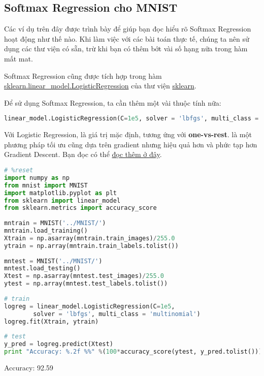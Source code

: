  
\subsection{Softmax Regression cho MNIST}
Các ví dụ trên đây được trình bày để giúp bạn đọc hiểu rõ Softmax Regression hoạt động như thế nào. Khi làm việc với các bài toán thực tế, chúng ta nên sử dụng các thư viện có sẵn, trừ khi bạn có thêm bớt vài số hạng nữa trong hàm mất mat.  
 
Softmax Regression cũng được tích hợp trong hàm \href{http://scikit-learn.org/stable/modules/generated/sklearn.linear_model.LogisticRegression.html}{sklearn.linear\_model.LogisticRegression} của thư viện \href{http://scikit-learn.org/stable/index.html}{sklearn}.  
 
Để sử dụng Softmax Regression, ta cần thêm một vài thuộc tính nữa:  
\begin{lstlisting}[language=Python]
linear_model.LogisticRegression(C=1e5, solver = 'lbfgs', multi_class = 'multinomial') 
\end{lstlisting}
 
Với Logistic Regression,  là giá trị mặc định, tương ứng với \textbf{one-vs-rest}.  là một phương pháp tối ưu cũng dựa trên gradient nhưng hiệu quả hơn và phức tạp hơn Gradient Descent. Bạn đọc có thể \href{https://en.wikipedia.org/wiki/Limited-memory_BFGS}{đọc thêm ở đây}.  
 
\begin{lstlisting}[language=Python]
# %reset 
import numpy as np  
from mnist import MNIST 
import matplotlib.pyplot as plt 
from sklearn import linear_model 
from sklearn.metrics import accuracy_score 
 
mntrain = MNIST('../MNIST/') 
mntrain.load_training() 
Xtrain = np.asarray(mntrain.train_images)/255.0 
ytrain = np.array(mntrain.train_labels.tolist()) 
 
mntest = MNIST('../MNIST/') 
mntest.load_testing() 
Xtest = np.asarray(mntest.test_images)/255.0 
ytest = np.array(mntest.test_labels.tolist()) 
 
# train 
logreg = linear_model.LogisticRegression(C=1e5,  
        solver = 'lbfgs', multi_class = 'multinomial') 
logreg.fit(Xtrain, ytrain) 
 
# test 
y_pred = logreg.predict(Xtest) 
print "Accuracy: %.2f %%" %(100*accuracy_score(ytest, y_pred.tolist())) 
\end{lstlisting}
 
    Accuracy: 92.59 %
 
